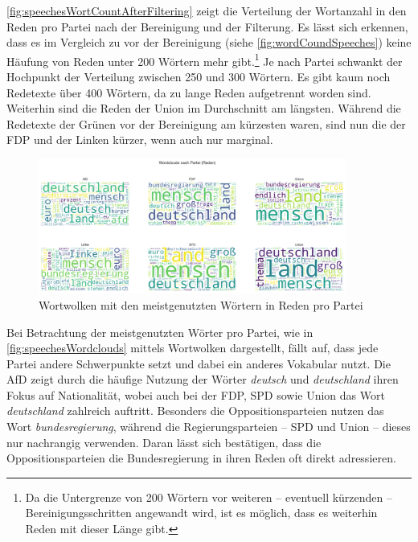 \autoref{fig:speechesWortCountAfterFiltering} zeigt die Verteilung der Wortanzahl in den Reden pro Partei nach der Bereinigung und der Filterung. Es lässt sich erkennen, dass es im Vergleich zu vor der Bereinigung (siehe \autoref{fig:wordCoundSpeeches}) keine Häufung von Reden unter \num{200} Wörtern mehr gibt.\footnote{Da die Untergrenze von \num{200} Wörtern vor weiteren -- eventuell kürzenden -- Bereinigungsschritten angewandt wird, ist es möglich, dass es weiterhin Reden mit dieser Länge gibt.} Je nach Partei schwankt der Hochpunkt der Verteilung zwischen \num{250} und \num{300} Wörtern. Es gibt kaum noch Redetexte über \num{400} Wörtern, da zu lange Reden aufgetrennt worden sind. Weiterhin sind die Reden der Union im Durchschnitt am längsten. Während die Redetexte der Grünen vor der Bereinigung am kürzesten waren, sind nun die der \ac{FDP} und der Linken kürzer, wenn auch nur marginal.

\begin{figure}[H]
    \centering
    \includegraphics[width=0.9\textwidth]{data/images/speeches/speeches_wordclouds.png}
    \caption{Wortwolken mit den meistgenutzten Wörtern in Reden pro Partei} \label{fig:speechesWordclouds}
\end{figure}

Bei Betrachtung der meistgenutzten Wörter pro Partei, wie in \autoref{fig:speechesWordclouds} mittels Wortwolken dargestellt, fällt auf, dass jede Partei andere Schwerpunkte setzt und dabei ein anderes Vokabular nutzt. Die \ac{AfD} zeigt durch die häufige Nutzung der Wörter \textit{deutsch} und \textit{deutschland} ihren Fokus auf Nationalität, wobei auch bei der \ac{FDP}, \ac{SPD} sowie Union das Wort \textit{deutschland} zahlreich auftritt. Besonders die Oppositionsparteien nutzen das Wort \textit{bundesregierung}, während die Regierungsparteien -- \ac{SPD} und Union -- dieses nur nachrangig verwenden. Daran lässt sich bestätigen, dass die Oppositionsparteien die Bundesregierung in ihren Reden oft direkt adressieren.

